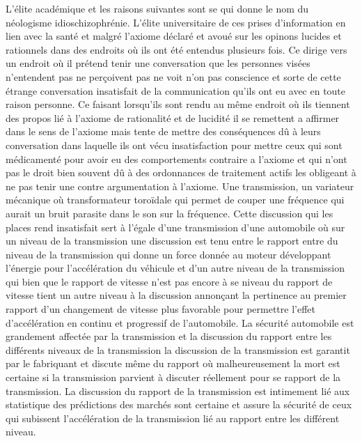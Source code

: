 \documentclass[12pt,a4paper]{article}
\begin{document}
L’élite académique et les raisons suivantes sont se qui donne le nom du néologisme idioschizophrénie. L’élite universitaire de ces prises d’information en lien avec la santé et malgré l’axiome déclaré et avoué sur les opinons lucides et rationnels dans des endroits où ils ont été entendus plusieurs fois. Ce dirige vers un endroit où il prétend  tenir une conversation que les personnes visées n’entendent pas ne perçoivent pas ne voit n’on pas conscience et sorte de cette étrange conversation insatisfait de la communication qu’ils ont eu avec en toute raison personne. Ce faisant lorsqu’ils sont rendu au même endroit où ils tiennent des propos lié à l’axiome de rationalité et de lucidité il se remettent a affirmer dans le sens de l’axiome mais tente de mettre des conséquences dû à leurs conversation dans laquelle ils ont vécu insatisfaction pour mettre ceux qui sont médicamenté pour avoir eu des comportements contraire a l’axiome et qui n’ont pas le droit bien souvent dû à des ordonnances de traitement actifs les obligeant à ne pas tenir une contre argumentation à l’axiome. Une transmission, un variateur mécanique où transformateur toroïdale qui permet de couper une fréquence qui aurait un bruit parasite dans le son sur la fréquence. Cette discussion qui les places rend insatisfait sert à l’égale d’une transmission d’une automobile où sur un niveau de la transmission une discussion est tenu entre le rapport entre du niveau de la transmission qui donne un force donnée au moteur développant l’énergie pour l’accélération du véhicule et d’un autre niveau de la transmission qui bien que le rapport de vitesse n’est pas encore à se niveau du rapport de vitesse tient un autre niveau à la discussion annonçant la pertinence au premier rapport d’un changement de vitesse plus favorable pour permettre l’effet d’accélération en continu et progressif de l’automobile. La sécurité automobile est grandement affectée par la transmission et la discussion du rapport entre les différents niveaux de la transmission la discussion de la transmission est garantit par le fabriquant et discute même du rapport où malheureusement la mort est certaine si la transmission parvient à discuter réellement pour se rapport de la transmission. La discussion du rapport de la transmission est intimement lié aux statistique des prédictions des marchés sont certaine et assure la sécurité de ceux qui subissent l’accélération de la transmission lié au rapport entre les différent niveau.
\end{document}

